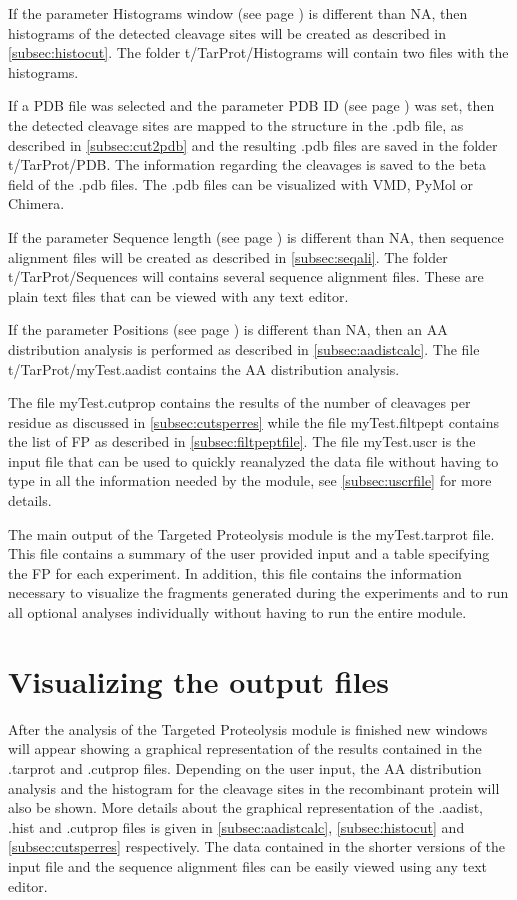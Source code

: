 If the parameter Histograms window (see page \pageref{par:enzdigHist}) is different than NA, then histograms of the detected cleavage sites will be created as described in \autoref{subsec:histocut}. The folder t/TarProt/Histograms will contain two files with the histograms.

If a PDB file was selected and the parameter PDB ID  (see page \pageref{par:pdbID}) was set, then the detected cleavage sites are mapped to the structure in the .pdb file, as described in \autoref{subsec:cut2pdb} and the resulting .pdb files are saved in the folder t/TarProt/PDB. The information regarding the cleavages is saved to the beta field of the .pdb files. The .pdb files can be visualized with VMD, PyMol or Chimera. 
  
If the parameter Sequence length (see page \pageref{par:enzdigSeqL}) is different than NA, then sequence alignment files will be created as described in \autoref{subsec:seqali}. The folder t/TarProt/Sequences will contains several sequence alignment files. These are plain text files that can be viewed with any text editor.

If the parameter Positions (see page \pageref{par:enzdigPos}) is different than NA, then an AA distribution analysis is performed as described in \autoref{subsec:aadistcalc}. The file t/TarProt/myTest.aadist contains the AA distribution analysis.

The file myTest.cutprop contains the results of the number of cleavages per residue as discussed in \autoref{subsec:cutsperres} while the file myTest.filtpept contains the list of FP as described in \autoref{subsec:filtpeptfile}. The file myTest.uscr is the input file that can be used to quickly reanalyzed the data file without having to type in all the information needed by the module, see \autoref{subsec:uscrfile} for more details. 

The main output of the Targeted Proteolysis module is the myTest.tarprot file. This file contains a summary of the user provided input and a table specifying the FP for each experiment. In addition, this file contains the information necessary to visualize the fragments generated during the experiments and to run all optional analyses individually without having to run the entire module.

\section{Visualizing the output files}

After the analysis of the Targeted Proteolysis module is finished new windows will appear showing a graphical representation of the results contained in the .tarprot and .cutprop files. Depending on the user input, the AA distribution analysis and the histogram for the cleavage sites in the recombinant protein will also be shown. More details about the graphical representation of the .aadist, .hist and .cutprop files is given in \autoref{subsec:aadistcalc}, \autoref{subsec:histocut} and \autoref{subsec:cutsperres} respectively. The data contained in the shorter versions of the input file and the sequence alignment files can be easily viewed using any text editor.   

